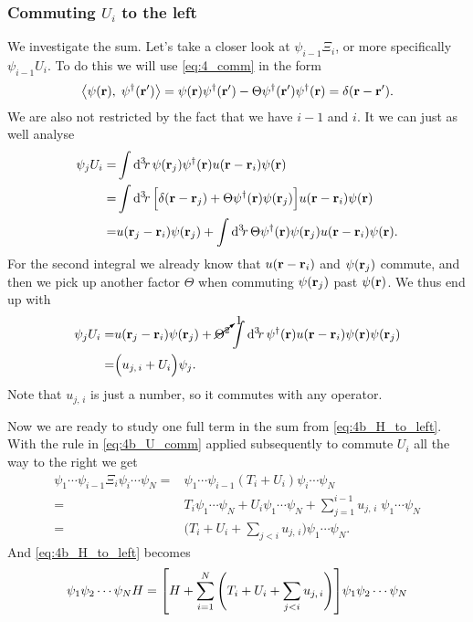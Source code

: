 \documentclass[11pt,letter, swedish, english
]{article}
\begin{document}
\subsubsection{Commuting $U_i$ to the left}
We investigate the sum. Let's take a closer look at $\psi_{i-1}\Xi_i$,
or more specifically $\psi_{i-1}U_i$. To do this we will use
\eqref{eq:4_comm} in the form
\begin{equation}
\left\langle\psi(\vb{r}),\;\psi^\dagger(\vb{r}')\right\rangle
=\psi(\vb{r})\psi^\dagger(\vb{r}')-\Theta\psi^\dagger(\vb{r}')\psi^\dagger(\vb{r})
=\delta(\vb{r}-\vb{r}').
\end{equation}
We are also not restricted by the fact that we have $i-1$ and $i$. It
we can just as well analyse
\begin{equation}
\begin{aligned}
\psi_{j}U_i=&\int\rd^3\!r\,
\psi(\vb{r}_{j})\psi^\dagger(\vb{r})
u(\vb{r}-\vb{r}_i)\psi(\vb{r})\\
=&\int\rd^3\!r\,
\Big[\delta(\vb{r}-\vb{r}_{j}) 
+ \Theta\psi^\dagger(\vb{r})\psi(\vb{r}_{j})\Big]
u(\vb{r}-\vb{r}_i)\psi(\vb{r})\\
=&
u(\vb{r}_{j}-\vb{r}_{i})\psi(\vb{r}_{j}) 
+ \int\rd^3\!r\,
\Theta\psi^\dagger(\vb{r})\psi(\vb{r}_{j})
u(\vb{r}-\vb{r}_i)\psi(\vb{r}).
\end{aligned}
\end{equation}
For the second integral we already know that $u(\vb{r}-\vb{r}_i)$ and
$\psi(\vb{r}_{j})$ commute, and then we pick up another factor
$\Theta$ when commuting $\psi(\vb{r}_{j})$ past $\psi(\vb{r})$. We
thus end up with
\begin{equation}\label{eq:4b_U_comm}
\begin{aligned}
\psi_{j}U_i=&
u(\vb{r}_{j}-\vb{r}_{i})\psi(\vb{r}_{j}) 
+ \cancelto{1}{\Theta^2}\int\rd^3\!r\,
\psi^\dagger(\vb{r})u(\vb{r}-\vb{r}_i)\psi(\vb{r})
\psi(\vb{r}_{j})\\
=&\Big(u_{j,\,i}+U_i \Big)\psi_{j}.
\end{aligned}
\end{equation}
Note that $u_{j,\,i}$ is just a number, so it commutes with any operator. 

Now we are ready to study one full term in the sum from
\eqref{eq:4b_H_to_left}. With the rule in \eqref{eq:4b_U_comm} applied
subsequently to commute $U_i$ all the way to the right we get
\begin{equation}
\begin{aligned}
\psi_1\cdots\psi_{i-1}\Xi_i\psi_i\cdots\psi_N
=&\psi_1\cdots\psi_{i-1}(T_i+U_i)\psi_i\cdots\psi_N\\
=&T_i\psi_1\cdots\psi_{N}
+U_i\psi_1\cdots\psi_{N}
+\sum_{j=1}^{i-1}u_{j,\,i}\;\psi_1\cdots\psi_{N}\\
=&\Bigg(T_i+U_i+\sum_{j<i}u_{j,\,i}\Bigg)\psi_1\cdots\psi_{N}.
\end{aligned}
\end{equation}
And \eqref{eq:4b_H_to_left} becomes
\begin{equation}\label{eq:4b_all_to_left}
\psi_1\psi_2\cdots\psi_{N}H=
\qty[H
+\sum_{i=1}^N\Bigg(T_i+U_i+\sum_{j<i}u_{j,\,i}\Bigg)
]\psi_1\psi_2\cdots\psi_{N}
\end{equation}
\end{document}
